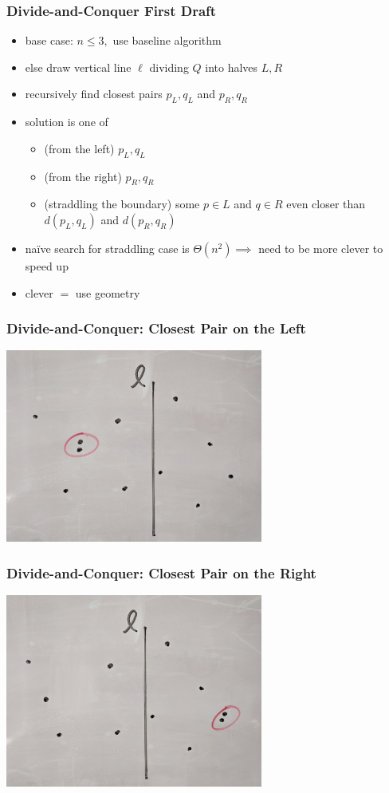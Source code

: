 \documentclass{beamer}
\begin{document}
\begin{frame} \frametitle{Divide-and-Conquer First Draft}
\begin{itemize}
  \item base case: $n \leq 3,$ use baseline algorithm
  \item else draw vertical line $\ell$ dividing $Q$ into halves $L, R$
  \item recursively find closest pairs $p_L, q_L$ and $p_R, q_R$
  \item solution is one of
  \begin{itemize}
    \item (from the left) $p_L, q_L$
    \item (from the right) $p_R, q_R$
    \item (straddling the boundary) some $p \in L$ and $q \in R$ even closer
      than $d(p_L, q_L)$ and $d(p_R, q_R)$
  \end{itemize}
  \item na\"{i}ve search for straddling case is $\Theta(n^2) \implies$ need to
    be more clever to speed up
  \item clever $=$ use geometry
\end{itemize}
\end{frame}

\begin{frame} \frametitle{Divide-and-Conquer: Closest Pair on the Left}
  \begin{center}
    \includegraphics[height=2.5in]{closest-pair-on-left.jpg}
  \end{center}
\end{frame}

\begin{frame} \frametitle{Divide-and-Conquer: Closest Pair on the Right}
  \begin{center}
    \includegraphics[height=2.5in]{closest-pair-on-right.jpg}
  \end{center}
\end{frame}
\end{document}
